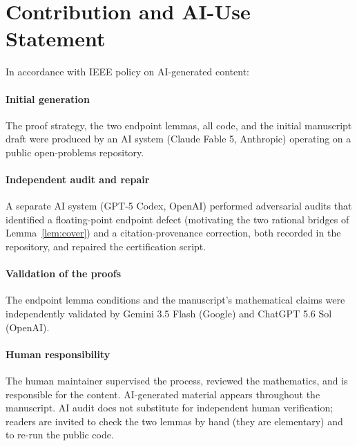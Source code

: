 \documentclass[12pt,draftclsnofoot,onecolumn,journal]{IEEEtran}
\begin{document}
\section*{Contribution and AI-Use Statement}

In accordance with IEEE policy on AI-generated content:

\paragraph{Initial generation} The proof strategy, the two endpoint lemmas,
all code, and the initial manuscript draft were produced by an AI system
(Claude Fable 5, Anthropic) operating on a public open-problems repository.

\paragraph{Independent audit and repair} A separate AI system (GPT-5 Codex,
OpenAI) performed adversarial audits that identified a floating-point
endpoint defect (motivating the two rational bridges of
Lemma~\ref{lem:cover}) and a citation-provenance correction, both recorded
in the repository, and repaired the certification script.

\paragraph{Validation of the proofs} The endpoint lemma conditions and the
manuscript's mathematical claims were independently validated by Gemini 3.5
Flash (Google) and ChatGPT 5.6 Sol (OpenAI).

\paragraph{Human responsibility} The human maintainer supervised the process,
reviewed the mathematics, and is responsible for the content. AI-generated
material appears throughout the manuscript. AI audit does not substitute for
independent human verification; readers are invited to check the two lemmas
by hand (they are elementary) and to re-run the public code.
\end{document}
